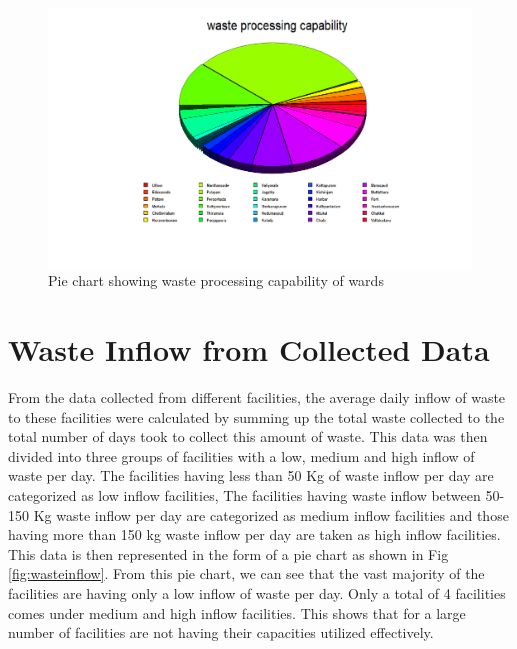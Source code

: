 \documentclass[12pt,a4paper]{report}
\begin{document}
\begin{figure}[H]
	\centering
	\includegraphics[width=1\linewidth]{waste_processing}
	\caption{Pie chart showing waste processing capability of wards}
	\label{fig:wasteprocessing}
\end{figure}

\section{Waste Inflow from Collected Data}

From the data collected from different facilities, the average daily inflow of waste to these facilities were calculated by summing up the total waste collected to the total number of days took to collect this amount of waste. This data was then divided into three groups of facilities with a low, medium and high inflow of waste per day. The facilities having less than 50 Kg of waste inflow per day are categorized as low inflow facilities, The facilities having waste inflow between 50-150 Kg waste inflow per day are categorized as medium inflow facilities and those having more than 150 kg waste inflow per day are taken as high inflow facilities. This data is then represented in  the form of a pie chart as shown in Fig \ref{fig:wasteinflow}. From this pie chart, we can see that the vast majority of the facilities are having only a low inflow of waste per day. Only a total of 4 facilities comes under medium and high inflow facilities. This shows that for a large number of facilities are not having their capacities utilized effectively. 
\end{document}
